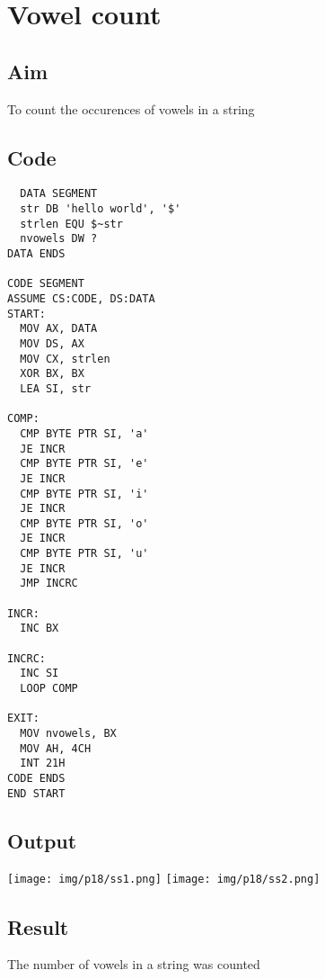 \section{Vowel count}
\subsection{Aim}
To count the occurences of vowels in a string

\subsection{Code}
\begin{lstlisting}
  DATA SEGMENT
  str DB 'hello world', '$'
  strlen EQU $~str
  nvowels DW ?
DATA ENDS

CODE SEGMENT
ASSUME CS:CODE, DS:DATA
START:
  MOV AX, DATA
  MOV DS, AX
  MOV CX, strlen
  XOR BX, BX
  LEA SI, str

COMP:
  CMP BYTE PTR SI, 'a'
  JE INCR
  CMP BYTE PTR SI, 'e'
  JE INCR
  CMP BYTE PTR SI, 'i'
  JE INCR
  CMP BYTE PTR SI, 'o'
  JE INCR
  CMP BYTE PTR SI, 'u'
  JE INCR
  JMP INCRC
  
INCR:
  INC BX
  
INCRC:
  INC SI
  LOOP COMP
  
EXIT:
  MOV nvowels, BX
  MOV AH, 4CH
  INT 21H
CODE ENDS
END START
\end{lstlisting}

\subsection{Output}
\begin{center}
	\texttt{[image: img/p18/ss1.png]}
	\texttt{[image: img/p18/ss2.png]}
\end{center}

\subsection{Result}
The number of vowels in a string was counted

